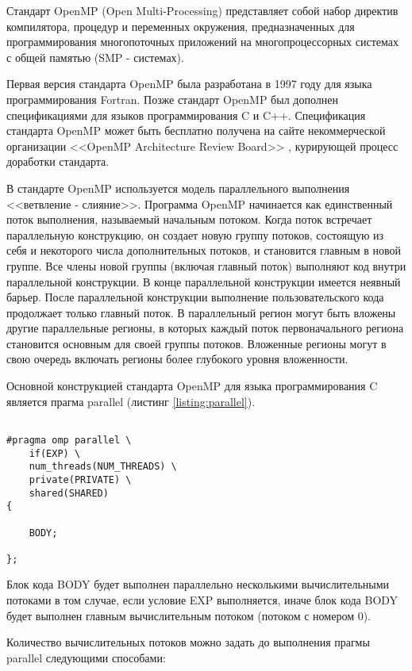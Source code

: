 Стандарт OpenMP (Open Multi-Processing) представляет собой набор директив компилятора, процедур и переменных окружения, предназначенных для программирования многопоточных приложений на многопроцессорных системах с общей памятью (SMP - системах).

Первая версия стандарта OpenMP была разработана в 1997 году для языка программирования Fortran. Позже стандарт OpenMP был дополнен спецификациями для языков программирования C и C++. Спецификация стандарта OpenMP может быть бесплатно получена на сайте некоммерческой организации <<OpenMP Architecture Review Board>> \cite{openmp}, курирующей процесс доработки стандарта.

В стандарте OpenMP используется модель параллельного выполнения <<ветвление - слияние>>. Программа OpenMP начинается как единственный поток выполнения, называемый начальным потоком. Когда поток встречает параллельную конструкцию, он создает новую группу потоков, состоящую из себя и некоторого числа дополнительных потоков, и становится главным в новой группе. Все члены новой группы (включая главный поток) выполняют код внутри параллельной конструкции. В конце параллельной конструкции имеется неявный барьер. После параллельной конструкции выполнение пользовательского кода продолжает только главный поток. В параллельный регион могут быть вложены другие параллельные регионы, в которых каждый поток первоначального региона становится основным для своей группы потоков. Вложенные регионы могут в свою очередь включать регионы более глубокого уровня вложенности.

Основной конструкцией стандарта OpenMP для языка программирования C является прагма parallel (листинг \ref{listing:parallel}).

\begin{lstlisting}

#pragma omp parallel \
	if(EXP) \
	num_threads(NUM_THREADS) \
	private(PRIVATE) \
	shared(SHARED)
{

	BODY;

};

\end{lstlisting}
\mylistingend

Блок кода BODY будет выполнен параллельно несколькими вычислительными потоками в том случае, если условие EXP выполняется, иначе блок кода BODY будет выполнен главным вычислительным потоком (потоком с номером 0).

Количество вычислительных потоков можно задать до выполнения прагмы parallel следующими способами:


